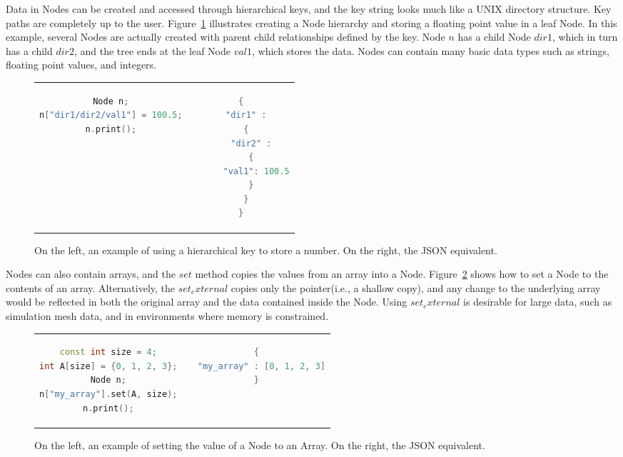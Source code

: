 Data in Nodes can be created and accessed through hierarchical keys,
and the key string looks much like a UNIX directory structure.
%
Key paths are completely up to the user.
%
Figure~\ref{ex:2} illustrates creating a Node hierarchy
and storing a floating point value in a leaf Node.
%
In this example, several Nodes are actually created with parent child
relationships defined by the key.
%
Node $n$ has a child Node $dir1$, which in turn has a child $dir2$,
and the tree ends at the leaf Node $val1$, which stores the data.
%
Nodes can contain many basic data types such as strings,
floating point values, and integers.

\begin{figure}
\begin{tabular}{cc}
  \begin{minipage}{.5\textwidth}
  \centering
    \begin{lstlisting}[language=C++]
Node n;
n["dir1/dir2/val1"] = 100.5;
n.print();
    \end{lstlisting}
  \end{minipage}
  &
  \begin{minipage}{.5\textwidth}
  \centering
  \begin{lstlisting}[language=C++]
{
  "dir1" :
  {
    "dir2" :
    {
      "val1": 100.5
    }
  }
}
  \end{lstlisting}
  \end{minipage}
\end{tabular}
\caption{\label{ex:2}On the left, an example of using a hierarchical key to store a number. On the right, the JSON equivalent.}
\end{figure}

Nodes can also contain arrays, and the $set$ method
copies the values from an array into a Node.
%
Figure~\ref{ex:3} shows how to set a Node to the contents of an array.
%
Alternatively, the $set_external$ copies only the pointer(i.e., a shallow copy),
and any change to the underlying array would be reflected in both the original
array and the data contained inside the Node.
%
Using $set_external$ is desirable for large data, such as simulation mesh data,
and in environments where memory is constrained.

\begin{figure}
\begin{tabular}{cc}
  \begin{minipage}{.5\textwidth}
  \centering
    \begin{lstlisting}[language=C++]
const int size = 4;
int A[size] = {0, 1, 2, 3};
Node n;
n["my_array"].set(A, size);
n.print();
    \end{lstlisting}
  \end{minipage}
  &
  \begin{minipage}{.5\textwidth}
  \centering
  \begin{lstlisting}[language=C++]
{
  "my_array" : [0, 1, 2, 3]
}
  \end{lstlisting}
  \end{minipage}
\end{tabular}

\caption{\label{ex:3}On the left, an example of setting the value of a Node to an Array. On the right, the JSON equivalent.}
\end{figure}
